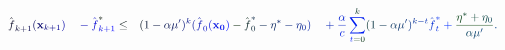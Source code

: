 \documentclass[12pt]{article}
\begin{document}
\makeatletter
\renewcommand*{\@textcolor}[3]{%
  \protect\leavevmode
  \begingroup
    \color#1{#2}#3%
  \endgroup
}
\makeatother
\begin{displaymath}
\begin{array} {rlrl} \displaystyle { {\mathcolor[RGB]{0,0,15}{\hat { \mathcolor[RGB]{0,0,30}{f} } }} _ { \mathcolor[RGB]{0,0,45}{k} \mathcolor[RGB]{0,0,60}{+} \mathcolor[RGB]{0,0,75}{1} } \mathcolor[RGB]{0,0,90}{(} { \mathbf { \mathcolor[RGB]{0,0,105}{x} } } _ { \mathcolor[RGB]{0,0,120}{k} \mathcolor[RGB]{0,0,135}{+} \mathcolor[RGB]{0,0,150}{1} } \mathcolor[RGB]{0,0,165}{)} } & \displaystyle { { } \mathcolor[RGB]{0,0,180}{-} {\mathcolor[RGB]{0,0,195}{\hat { \mathcolor[RGB]{0,0,210}{f} } }} _ { \mathcolor[RGB]{0,0,225}{k} \mathcolor[RGB]{0,0,240}{+} \mathcolor[RGB]{0,0,255}{1} } ^ { \mathcolor[RGB]{0,15,0}{*} } \mathcolor[RGB]{0,15,15}{\leq} } & \displaystyle { \mathcolor[RGB]{0,15,30}{(} \mathcolor[RGB]{0,15,45}{1} \mathcolor[RGB]{0,15,60}{-} \mathcolor[RGB]{0,15,75}{\alpha} \mathcolor[RGB]{0,15,90}{\mu} ^ { \mathcolor[RGB]{0,15,105}{\prime} } \mathcolor[RGB]{0,15,120}{)} ^ { \mathcolor[RGB]{0,15,135}{k} } \mathcolor[RGB]{0,15,150}{(} {\mathcolor[RGB]{0,15,165}{\hat { \mathcolor[RGB]{0,15,180}{f} } }} _ { \mathcolor[RGB]{0,15,195}{0} } \mathcolor[RGB]{0,15,210}{(} { \mathbf { \mathcolor[RGB]{0,15,225}{x} _ { \mathcolor[RGB]{0,15,240}{0} } } } \mathcolor[RGB]{0,15,255}{)} \mathcolor[RGB]{0,30,0}{-} {\mathcolor[RGB]{0,30,15}{\hat { \mathcolor[RGB]{0,30,30}{f} } }} _ { \mathcolor[RGB]{0,30,45}{0} } ^ { \mathcolor[RGB]{0,30,60}{*} } \mathcolor[RGB]{0,30,75}{-} \mathcolor[RGB]{0,30,90}{\eta} ^ { \mathcolor[RGB]{0,30,105}{*} } \mathcolor[RGB]{0,30,120}{-} \mathcolor[RGB]{0,30,135}{\eta} _ { \mathcolor[RGB]{0,30,150}{0} } \mathcolor[RGB]{0,30,165}{)} } & \displaystyle { { } \mathcolor[RGB]{0,30,180}{+} \mathcolor[RGB]{0,30,195}{\frac { \mathcolor[RGB]{0,30,210}{\alpha} } { \mathcolor[RGB]{0,30,225}{c} } } \mathcolor[RGB]{0,30,240}{\sum} _ { \mathcolor[RGB]{0,30,255}{t} \mathcolor[RGB]{0,45,0}{=} \mathcolor[RGB]{0,45,15}{0} } ^ { \mathcolor[RGB]{0,45,30}{k} } \mathcolor[RGB]{0,45,45}{(} \mathcolor[RGB]{0,45,60}{1} \mathcolor[RGB]{0,45,75}{-} \mathcolor[RGB]{0,45,90}{\alpha} \mathcolor[RGB]{0,45,105}{\mu} ^ { \mathcolor[RGB]{0,45,120}{\prime} } \mathcolor[RGB]{0,45,135}{)} ^ { \mathcolor[RGB]{0,45,150}{k} \mathcolor[RGB]{0,45,165}{-} \mathcolor[RGB]{0,45,180}{t} } {\mathcolor[RGB]{0,45,195}{\hat { \mathcolor[RGB]{0,45,210}{f} } }} _ { \mathcolor[RGB]{0,45,225}{t} } ^ { \mathcolor[RGB]{0,45,240}{*} } \mathcolor[RGB]{0,45,255}{+} \mathcolor[RGB]{0,60,0}{\frac { \mathcolor[RGB]{0,60,15}{\eta} ^ { \mathcolor[RGB]{0,60,30}{*} } \mathcolor[RGB]{0,60,45}{+} \mathcolor[RGB]{0,60,60}{\eta} _ { \mathcolor[RGB]{0,60,75}{0} } } { \mathcolor[RGB]{0,60,90}{\alpha} \mathcolor[RGB]{0,60,105}{\mu} ^ { \mathcolor[RGB]{0,60,120}{\prime} } } } \mathcolor[RGB]{0,60,135}{.} } \end{array}
\end{displaymath}
\end{document}
